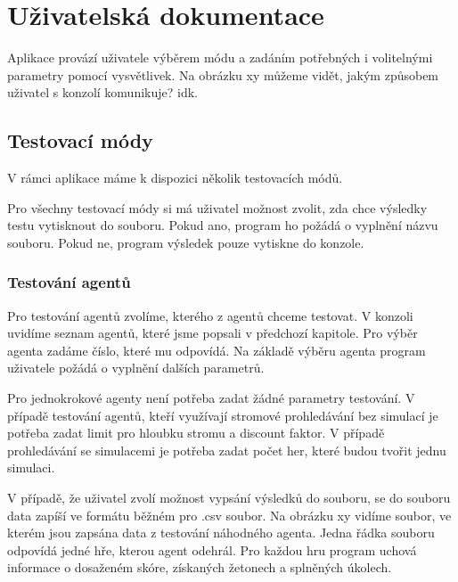 \chapter{Uživatelská dokumentace}


\figureKonzole

Aplikace provází uživatele výběrem módu a zadáním potřebných i volitelnými parametry pomocí vysvětlivek. Na obrázku xy můžeme vidět, jakým způsobem uživatel s konzolí komunikuje? idk.

\section{Testovací módy}

V rámci aplikace máme k dispozici několik testovacích módů. 

Pro všechny testovací módy si má uživatel možnost zvolit, zda chce výsledky testu vytisknout do souboru. Pokud ano, program ho požádá o vyplnění názvu souboru. Pokud ne, program výsledek pouze vytiskne do konzole.

\subsection{Testování agentů}
Pro testování agentů zvolíme, kterého z agentů chceme testovat. V konzoli uvidíme seznam agentů, které jsme popsali v předchozí kapitole. Pro výběr agenta zadáme číslo, které mu odpovídá. Na základě výběru agenta program uživatele požádá o vyplnění dalších parametrů.

Pro jednokrokové agenty není potřeba zadat žádné parametry testování. V případě testování agentů, kteří využívají stromové prohledávání bez simulací je potřeba zadat limit pro hloubku stromu a discount faktor. V případě prohledávání se simulacemi je potřeba zadat počet her, které budou tvořit jednu simulaci. 

V případě, že uživatel zvolí možnost vypsání výsledků do souboru, se do souboru data zapíší ve formátu běžném pro .csv soubor. Na obrázku xy vidíme soubor, ve kterém jsou zapsána data z testování náhodného agenta. Jedna řádka souboru odpovídá jedné hře, kterou agent odehrál. Pro každou hru program uchová informace o dosaženém skóre, získaných žetonech a splněných úkolech.

